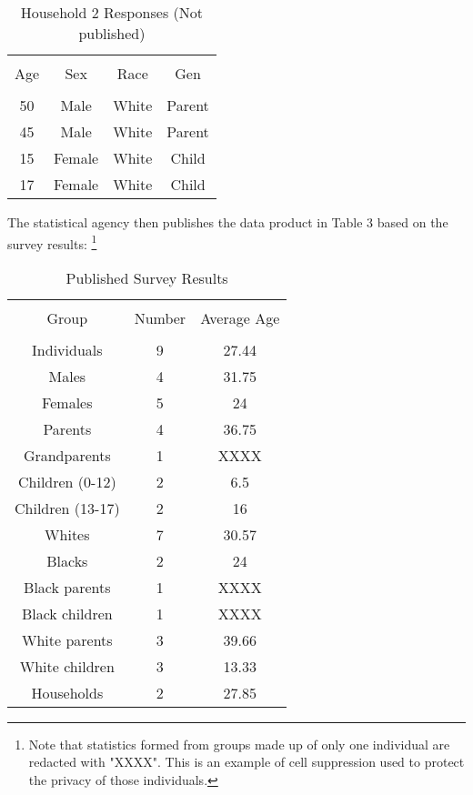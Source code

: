 \documentclass[jou,apacite]{apa6}
\begin{document}
\begin{table}[!htb]
\caption{Household 2 Responses (Not published)}\label{tab2}
\begin{tabular}{cccc}
\hline\\[-1.5ex]
Age & Sex & Race & Gen \\[0.5ex]
\hline\\[-1.5ex]
50 & Male & White & Parent\\[0.5ex]
45 & Male & White & Parent\\[0.5ex]
15 & Female & White & Child\\[0.5ex]
17 & Female & White & Child\\[0.5ex]
\hline
\end{tabular}
\end{table}

The statistical agency then publishes the data product in Table 3 based on the survey results: \footnote {Note that statistics formed from groups made up of only one individual are redacted with "XXXX". This is an example of cell suppression used to protect the privacy of those individuals.}

\begin{table}[!htb]
\caption{Published Survey Results}\label{tab3}
\begin{tabular}{ccc}
\hline\\[-1.5ex]
Group & Number & Average Age \\[0.5ex]
\hline\\[-1.5ex]
Individuals & 9 & 27.44 \\[0.5ex]
Males & 4 & 31.75 \\[0.5ex]
Females & 5 & 24 \\[0.5ex]
Parents & 4 & 36.75 \\[0.5ex]
Grandparents & 1 & XXXX \\[0.5ex]
Children (0-12) & 2 & 6.5 \\[0.5ex]
Children (13-17) & 2 & 16 \\[0.5ex]
Whites & 7 & 30.57 \\[0.5ex]
Blacks & 2 & 24 \\[0.5ex]
Black parents & 1 & XXXX \\[0.5ex]
Black children & 1 & XXXX\\[0.5ex]
White parents & 3 & 39.66 \\[0.5ex]
White children & 3 & 13.33 \\[0.5ex]
Households & 2 & 27.85 \\[0.5ex]
\hline
\end{tabular}
\end{table}
\end{document}
